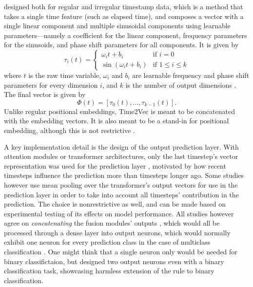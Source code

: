 \documentclass[stu,floatsintext]{apa7}
\begin{document}
designed both for regular and irregular timestamp data, which is a method that takes a single time feature (such as elapsed time), and composes a vector with a single linear component and multiple sinusoidal components using learnable parameters—namely a coefficient for the linear component, frequency parameters for the sinusoids, and phase shift parameters for all components. It is given by
\begin{equation}\tau_i(t)=\begin{cases}
\omega_it+b_i&\text{if }i=0\\
\sin(\omega_it+b_i)&\text{if }1\le i\le k
\end{cases}\end{equation}
where $t$ is the raw time variable, $\omega_i$ and $b_i$ are learnable frequency and phase shift parameters for every dimension $i$, and $k$ is the number of output dimensions \parencite{kazemi2019time2vec}. The final vector is given by
\begin{equation}\Phi(t)=[\tau_0(t),\dots,\tau_{k-1}(t)].\end{equation}
Unlike regular positional embeddings, Time2Vec is meant to be concatenated with the embedding vectors. It is also meant to be a stand-in for positional embedding, although this is not restrictive \parencite{ughi2023two}.

A key implementation detail is the design of the output prediction layer. With attention modules or transformer architectures, only the last timestep's vector representation was used for the prediction layer \parencite{bustarviejo2026multimodal,jang2025selective}, motivated by how recent timesteps influence the prediction more than timesteps longer ago. Some studies however \parencite{dashtaki2025hsif} use mean pooling over the transformer's output vectors for use in the prediction layer in order to take into account all timesteps' contribution in the prediction. The choice is nonrestrictive as well, and can be made based on experimental testing of its effects on model performance. All studies however agree on \textit{concatenating} the fusion modules' outputs \parencite{chen2026newsdriven,fataliyev2023mcasp,dashtaki2025hsif}, which would all be processed through a dense layer into output neurons, which would normally exhibit one neuron for every prediction class in the case of multiclass classification \textcite{chen2021stock}. One might think that a single neuron only would be needed for binary classifictaion, but \textcite{chen2026newsdriven} designed two output neurons even with a binary classification task, showcasing harmless extension of the rule to binary classification.
\end{document}
